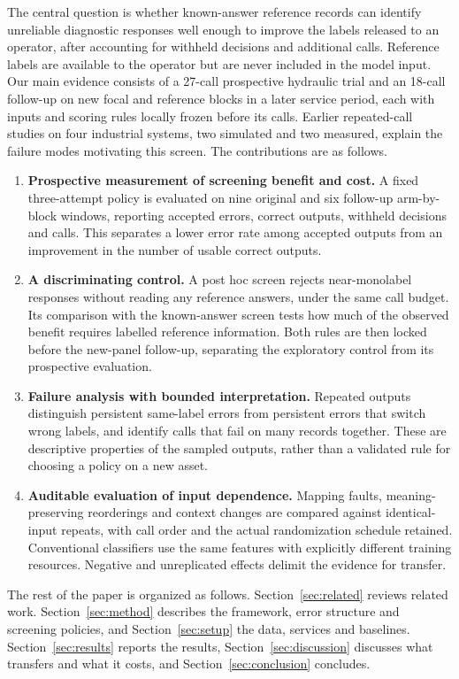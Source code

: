 \documentclass[11pt,a4paper]{article}
\begin{document}
The central question is whether known-answer reference records can identify unreliable diagnostic responses well enough to improve the labels released to an operator, after accounting for withheld decisions and additional calls. Reference labels are available to the operator but are never included in the model input. Our main evidence consists of a 27-call prospective hydraulic trial and an 18-call follow-up on new focal and reference blocks in a later service period, each with inputs and scoring rules locally frozen before its calls. Earlier repeated-call studies on four industrial systems, two simulated and two measured, explain the failure modes motivating this screen. The contributions are as follows.
\begin{enumerate}
\item \textbf{Prospective measurement of screening benefit and cost.} A fixed three-attempt policy is evaluated on nine original and six follow-up arm-by-block windows, reporting accepted errors, correct outputs, withheld decisions and calls. This separates a lower error rate among accepted outputs from an improvement in the number of usable correct outputs.
\item \textbf{A discriminating control.} A post hoc screen rejects near-monolabel responses without reading any reference answers, under the same call budget. Its comparison with the known-answer screen tests how much of the observed benefit requires labelled reference information. Both rules are then locked before the new-panel follow-up, separating the exploratory control from its prospective evaluation.
\item \textbf{Failure analysis with bounded interpretation.} Repeated outputs distinguish persistent same-label errors from persistent errors that switch wrong labels, and identify calls that fail on many records together. These are descriptive properties of the sampled outputs, rather than a validated rule for choosing a policy on a new asset.
\item \textbf{Auditable evaluation of input dependence.} Mapping faults, meaning-preserving reorderings and context changes are compared against identical-input repeats, with call order and the actual randomization schedule retained. Conventional classifiers use the same features with explicitly different training resources. Negative and unreplicated effects delimit the evidence for transfer.
\end{enumerate}

The rest of the paper is organized as follows. Section~\ref{sec:related} reviews related work. Section~\ref{sec:method} describes the framework, error structure and screening policies, and Section~\ref{sec:setup} the data, services and baselines. Section~\ref{sec:results} reports the results, Section~\ref{sec:discussion} discusses what transfers and what it costs, and Section~\ref{sec:conclusion} concludes.
\end{document}

